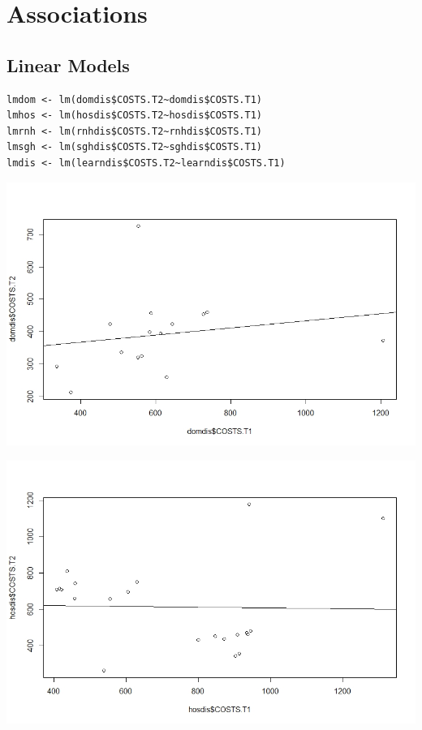 \documentclass[]{article}
\begin{document}
\section{Associations}
\subsection{Linear Models}

\begin{lstlisting}
lmdom <- lm(domdis$COSTS.T2~domdis$COSTS.T1)
lmhos <- lm(hosdis$COSTS.T2~hosdis$COSTS.T1)
lmrnh <- lm(rnhdis$COSTS.T2~rnhdis$COSTS.T1)
lmsgh <- lm(sghdis$COSTS.T2~sghdis$COSTS.T1)
lmdis <- lm(learndis$COSTS.T2~learndis$COSTS.T1)
\end{lstlisting}


\centering
\includegraphics[width=\textwidth]{RStudio/jpeg/Reg_DOM.jpeg}
\raggedright


\centering
\includegraphics[width=\textwidth]{RStudio/jpeg/Reg_HOS.jpeg}
\raggedright
\end{document}
